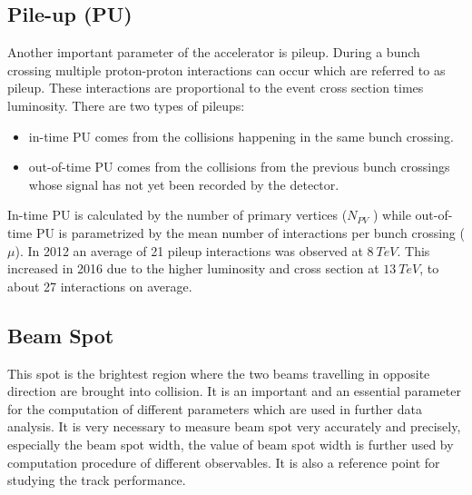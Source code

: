 \subsection{Pile-up (PU)}
Another important parameter of the accelerator is pileup. During a bunch crossing multiple proton-proton interactions can occur which are referred to as pileup. These interactions are proportional to the event cross section times luminosity. There are two types of pileups:
\begin{itemize}
\item in-time PU comes from the collisions happening in the same bunch crossing.
\item out-of-time PU comes from the collisions from the previous bunch crossings whose signal has not yet been recorded by the detector.
\end{itemize}
In-time PU is calculated by the number of primary vertices ($N_{PV}$ ) while out-of-time PU is parametrized by the mean number of interactions per bunch crossing ($\mu$). In 2012 an average of 21 pileup interactions was observed at $8~TeV$. This increased in 2016 due to the higher luminosity and cross section at $13~TeV$, to about 27 interactions on average. 


\subsection{Beam Spot}
This spot is the brightest region where the two beams travelling in opposite direction are brought into collision. It is an important and an essential parameter for the computation of different parameters which are used in further data analysis. It is very necessary to measure beam spot very accurately and precisely, especially the beam spot width, the value of beam spot width is further used by computation procedure of different observables. It is also a reference point for studying the track performance.

